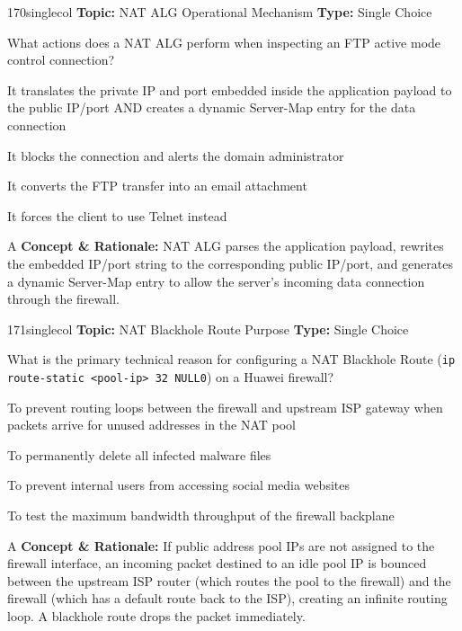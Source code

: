 \begin{qcard}{170}{singlecol}
\textcolor{darkslate!75}{\small\textbf{Topic:} NAT ALG Operational Mechanism \hfill \textbf{Type:} Single Choice}\vspace{0.4em}\par
What actions does a NAT ALG perform when inspecting an FTP active mode control connection?
\begin{qoptions}
\item It translates the private IP and port embedded inside the application payload to the public IP/port AND creates a dynamic Server-Map entry for the data connection
\item It blocks the connection and alerts the domain administrator
\item It converts the FTP transfer into an email attachment
\item It forces the client to use Telnet instead
\end{qoptions}
\end{qcard}
\nopagebreak
\begin{explainbox}{A}
\textbf{Concept \& Rationale:} NAT ALG parses the application payload, rewrites the embedded IP/port string to the corresponding public IP/port, and generates a dynamic Server-Map entry to allow the server's incoming data connection through the firewall.
\end{explainbox}

\begin{qcard}{171}{singlecol}
\textcolor{darkslate!75}{\small\textbf{Topic:} NAT Blackhole Route Purpose \hfill \textbf{Type:} Single Choice}\vspace{0.4em}\par
What is the primary technical reason for configuring a NAT Blackhole Route (\texttt{ip route-static \textless{}pool-ip\textgreater{} 32 NULL0}) on a Huawei firewall?
\begin{qoptions}
\item To prevent routing loops between the firewall and upstream ISP gateway when packets arrive for unused addresses in the NAT pool
\item To permanently delete all infected malware files
\item To prevent internal users from accessing social media websites
\item To test the maximum bandwidth throughput of the firewall backplane
\end{qoptions}
\end{qcard}
\nopagebreak
\begin{explainbox}{A}
\textbf{Concept \& Rationale:} If public address pool IPs are not assigned to the firewall interface, an incoming packet destined to an idle pool IP is bounced between the upstream ISP router (which routes the pool to the firewall) and the firewall (which has a default route back to the ISP), creating an infinite routing loop. A blackhole route drops the packet immediately.
\end{explainbox}

